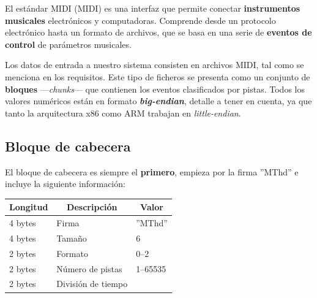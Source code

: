 El estándar \acrshort{MIDI} (\acrlong{MIDI}) es una interfaz que permite conectar \textbf{instrumentos musicales} electrónicos y computadoras. Comprende desde un protocolo electrónico hasta un formato de archivos, que se basa en una serie de \textbf{eventos de control} de parámetros musicales. \cite{wiki_midi}

Los datos de entrada a nuestro sistema consisten en archivos \acrshort{MIDI}, tal como se menciona en los requisitos. Este tipo de ficheros se presenta como un conjunto de \textbf{bloques} ---\textit{chunks}--- que contienen los eventos clasificados por pistas. Todos los valores numéricos están en formato \textbf{\textit{big-endian}}, detalle a tener en cuenta, ya que tanto la arquitectura x86 como ARM trabajan en \textit{little-endian}. \cite{midi}

\subsection{Bloque de cabecera}

El bloque de cabecera es siempre el \textbf{primero}, empieza por la firma ''MThd'' e incluye la siguiente información:

\smallskip

\begin{center}
	\begin{tabular}{|l|l|l|}
		\hline \multicolumn{1}{|c|}{\textbf{Longitud}} & \multicolumn{1}{c|}{\textbf{Descripción}} & \multicolumn{1}{c|}{\textbf{Valor}} \\
		\hline 4 bytes & Firma & ''MThd'' \\ 
		\hline 4 bytes & Tamaño & 6 \\ 
		\hline 2 bytes & Formato & 0--2 \\ 
		\hline 2 bytes & Número de pistas & 1--65535 \\ 
		\hline 2 bytes & División de tiempo &  \\ 
		\hline 
	\end{tabular}
	\smallskip
\end{center}

\smallskip

